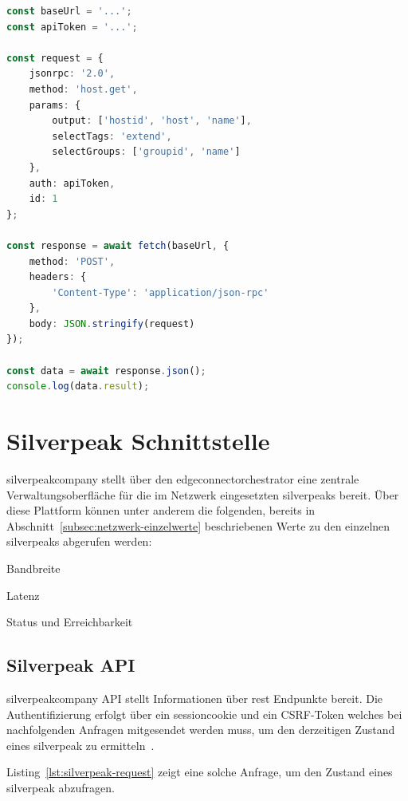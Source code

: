 \begin{lstlisting}[language=Typescript, caption={Zabbix API Request}, label={lst:zabbix-request}]
const baseUrl = '...';
const apiToken = '...';

const request = {
    jsonrpc: '2.0',
    method: 'host.get',
    params: {
        output: ['hostid', 'host', 'name'],
        selectTags: 'extend',
        selectGroups: ['groupid', 'name']
    },
    auth: apiToken,
    id: 1
};

const response = await fetch(baseUrl, {
    method: 'POST',
    headers: {
        'Content-Type': 'application/json-rpc'
    },
    body: JSON.stringify(request)
});

const data = await response.json();
console.log(data.result);
\end{lstlisting}

\section{Silverpeak Schnittstelle}
\label{sec:silverpeak}

\gls{silverpeakcompany} stellt über den \gls{edgeconnectorchestrator} eine zentrale Verwaltungsoberfläche für die 
im Netzwerk eingesetzten \glspl{silverpeak} bereit. Über diese Plattform können unter anderem die folgenden, 
bereits in Abschnitt~\ref{subsec:netzwerk-einzelwerte} beschriebenen Werte zu den einzelnen \glspl{silverpeak} abgerufen werden:

\begin{compactitem}
    \label{list:silverpeak-values}
    \item Bandbreite
    \item Latenz
    \item Status und Erreichbarkeit
\end{compactitem}

\subsection{Silverpeak API}
\label{subsec:silverpeak-api}

\gls{silverpeakcompany} API stellt Informationen über \gls{rest} Endpunkte bereit. Die Authentifizierung erfolgt über ein \gls{sessioncookie}
und ein CSRF-Token welches 
bei nachfolgenden Anfragen mitgesendet werden muss, um den derzeitigen Zustand eines \gls{silverpeak} zu ermitteln~\cite{aruba2026userguide}.

Listing~\ref{lst:silverpeak-request} zeigt eine solche Anfrage, um den Zustand eines
\gls{silverpeak} abzufragen.

